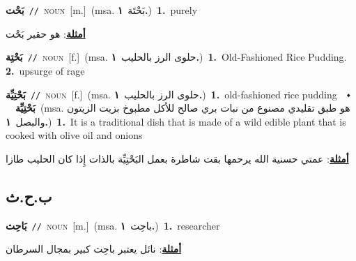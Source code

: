 \documentclass[10pt,a4paper,twoside]{article} %
\begin{document}
\begin{multicols}{2}
{{{{{\setlength\topsep{0pt}\textbf{\foreignlanguage{arabic}{بَحْت}}\ {\color{gray}\texttt{//}\color{black}}\ \textsc{noun}\ [m.]\ \color{gray}(msa. \foreignlanguage{arabic}{بَحْتَة}~\foreignlanguage{arabic}{\textbf{١.}})\color{black}\ \textbf{1.}~purely\  \begin{flushright}\color{gray}\foreignlanguage{arabic}{\textbf{\underline{\foreignlanguage{arabic}{أمثلة}}}: هو حقير بَحْت}\end{flushright}\color{black}} \vspace{2mm}

{\setlength\topsep{0pt}\textbf{\foreignlanguage{arabic}{بَحْتِة}}\ {\color{gray}\texttt{//}\color{black}}\ \textsc{noun}\ [f.]\ \color{gray}(msa. \foreignlanguage{arabic}{حلوى الرز بالحليب}~\foreignlanguage{arabic}{\textbf{١.}})\color{black}\ \textbf{1.}~Old-Fashioned Rice Pudding.  \textbf{2.}~upsurge of rage\ 

{\setlength\topsep{0pt}\textbf{\foreignlanguage{arabic}{بَحْتِيِّة}}\ {\color{gray}\texttt{//}\color{black}}\ \textsc{noun}\ [f.]\ \color{gray}(msa. \foreignlanguage{arabic}{حلوى الرز بالحليب}~\foreignlanguage{arabic}{\textbf{١.}})\color{black}\ \textbf{1.}~old-fashioned rice pudding\ \ $\smblkdiamond$\ \ \setlength\topsep{0pt}\textbf{\foreignlanguage{arabic}{بَحْتِيِّة}}\ \color{gray}(msa. \foreignlanguage{arabic}{هو طبق تقليدي مصنوع من نبات بري صالح للأكل مطبوخ بزيت الزيتون والبصل}~\foreignlanguage{arabic}{\textbf{١.}})\color{black}\ \textbf{1.}~It is a traditional dish that is made of a wild edible plant that is cooked with olive oil and onions\  \begin{flushright}\color{gray}\foreignlanguage{arabic}{\textbf{\underline{\foreignlanguage{arabic}{أمثلة}}}: عمتي حسنية الله يرحمها بقت شاطرة بعمل البَحْتِيِّة بالذات إِذا كان الحليب طازا}\end{flushright}\color{black}} \vspace{2mm}

\vspace{-3mm}
\subsection*{\color{blue}\foreignlanguage{arabic}{ب.ح.ث}\color{blue}{}} 

{\setlength\topsep{0pt}\textbf{\foreignlanguage{arabic}{بَاحِث}}\ {\color{gray}\texttt{//}\color{black}}\ \textsc{noun}\ [m.]\ \color{gray}(msa. \foreignlanguage{arabic}{باحِث}~\foreignlanguage{arabic}{\textbf{١.}})\color{black}\ \textbf{1.}~researcher\  \begin{flushright}\color{gray}\foreignlanguage{arabic}{\textbf{\underline{\foreignlanguage{arabic}{أمثلة}}}: نائل يعتبر باحِث كبير بمجال السرطان}\end{flushright}\color{black}} \vspace{2mm}

}}}}}
\end{multicols}
\end{document}
